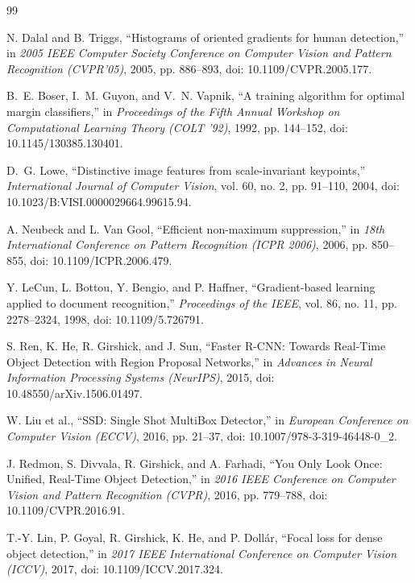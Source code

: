 \documentclass[11pt,a4paper,twoside]{article}
\begin{document}
\clearpage

\begingroup
\setlength{\parskip}{0pt}

\begin{thebibliography}{99}
\setlength{\itemsep}{0pt}

N. Dalal and B. Triggs,
``Histograms of oriented gradients for human detection,''
in \emph{2005 IEEE Computer Society Conference on Computer Vision and Pattern Recognition (CVPR'05)}, 2005, pp. 886--893, doi: 10.1109/CVPR.2005.177.

B.~E. Boser, I.~M. Guyon, and V.~N. Vapnik,
``A training algorithm for optimal margin classifiers,''
in \emph{Proceedings of the Fifth Annual Workshop on Computational Learning Theory (COLT '92)}, 1992, pp. 144--152, doi: 10.1145/130385.130401.

D.~G. Lowe,
``Distinctive image features from scale-invariant keypoints,''
\emph{International Journal of Computer Vision}, vol. 60, no. 2, pp. 91--110, 2004, doi: 10.1023/B:VISI.0000029664.99615.94.

A. Neubeck and L. Van Gool,
``Efficient non-maximum suppression,''
in \emph{18th International Conference on Pattern Recognition (ICPR 2006)}, 2006, pp. 850--855, doi: 10.1109/ICPR.2006.479.

Y. LeCun, L. Bottou, Y. Bengio, and P. Haffner,
``Gradient-based learning applied to document recognition,''
\emph{Proceedings of the IEEE}, vol. 86, no. 11, pp. 2278--2324, 1998, doi: 10.1109/5.726791.

S. Ren, K. He, R. Girshick, and J. Sun,
``Faster R-CNN: Towards Real-Time Object Detection with Region Proposal Networks,''
in \emph{Advances in Neural Information Processing Systems (NeurIPS)}, 2015, doi: 10.48550/arXiv.1506.01497.

W. Liu et al.,
``SSD: Single Shot MultiBox Detector,''
in \emph{European Conference on Computer Vision (ECCV)}, 2016, pp. 21--37, doi: 10.1007/978-3-319-46448-0\_2.

J. Redmon, S. Divvala, R. Girshick, and A. Farhadi,
``You Only Look Once: Unified, Real-Time Object Detection,''
in \emph{2016 IEEE Conference on Computer Vision and Pattern Recognition (CVPR)}, 2016, pp. 779--788, doi: 10.1109/CVPR.2016.91.

T.-Y. Lin, P. Goyal, R. Girshick, K. He, and P. Doll\'{a}r,
``Focal loss for dense object detection,''
in \emph{2017 IEEE International Conference on Computer Vision (ICCV)}, 2017, doi: 10.1109/ICCV.2017.324.


\end{thebibliography}
\end{document}
